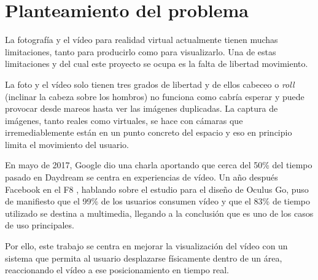 
\pagestyle{empty}
\chapter {Planteamiento del problema}

La fotografía y el vídeo para realidad virtual actualmente tienen muchas limitaciones, tanto para producirlo como para visualizarlo. Una de estas limitaciones y del cual este proyecto se ocupa es la falta de libertad movimiento. 

La foto y el vídeo solo tienen tres grados de libertad y de ellos cabeceo o \textit{roll} (inclinar la cabeza sobre los hombros) no funciona como cabría esperar y puede provocar desde mareos hasta ver las imágenes duplicadas. La captura de imágenes, tanto reales como virtuales, se hace con cámaras que irremediablemente están en un punto concreto del espacio y eso en principio limita el movimiento del usuario.

En mayo de 2017, Google dio una charla aportando que cerca del 50\% del tiempo pasado en Daydream se centra en experiencias de vídeo. Un año después Facebook en el F8 \cite{FBOculusGo}, hablando sobre el estudio para el diseño de Oculus Go, puso de manifiesto que el 99\% de los usuarios consumen vídeo y que el 83\% de tiempo utilizado se destina a multimedia, llegando a la conclusión que es uno de los casos de uso principales.

Por ello, este trabajo se centra en mejorar la visualización del vídeo con un sistema que permita al usuario desplazarse físicamente dentro de un área, reaccionando el vídeo a ese posicionamiento en tiempo real.
